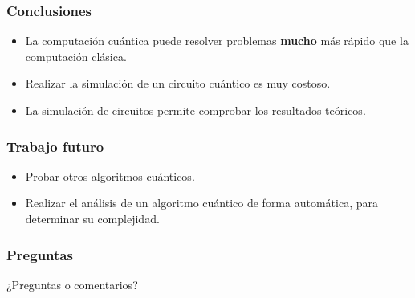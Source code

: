 \begin{frame}
\frametitle{Conclusiones}

\begin{itemize}
\item La computación cuántica puede resolver problemas \textbf{mucho} más rápido 
que la computación clásica.
\item Realizar la simulación de un circuito cuántico es muy costoso.
\item La simulación de circuitos permite comprobar los resultados teóricos.
\end{itemize}

\end{frame}
\begin{frame}
\frametitle{Trabajo futuro}
\begin{itemize}
\item Probar otros algoritmos cuánticos.
\item Realizar el análisis de un algoritmo cuántico de forma automática, para 
determinar su complejidad.
\end{itemize}

\end{frame}
\begin{frame}
\frametitle{Preguntas}
¿Preguntas o comentarios?

\end{frame}



